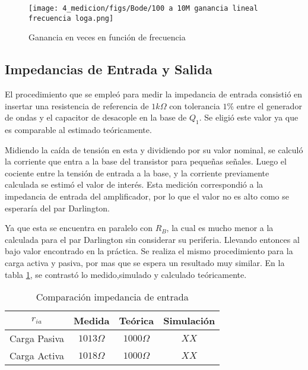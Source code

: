 \begin{figure}[ht]
    \centering
    \texttt{[image: 4\_medicion/figs/Bode/100 a 10M ganancia lineal frecuencia loga.png]}
    \caption{Ganancia en veces en función de frecuencia}\label{fig:ganancia veces funcion frecuencia medido}
\end{figure}



\subsection{Impedancias de Entrada y Salida}

El procedimiento que se empleó para medir la impedancia de entrada consistió en insertar una resistencia de referencia de $1 k\Omega$ con tolerancia $1\%$ entre el generador de ondas y el capacitor de desacople en la base de $Q_1$. Se eligió este valor ya que es comparable al estimado teóricamente.

Midiendo la caída de tensión en esta y dividiendo por su valor nominal, se calculó la corriente que entra a la base del transistor para pequeñas señales. Luego el cociente entre la tensión de entrada a la base, y la corriente previamente calculada se estimó el valor de interés. Esta medición correspondió a la impedancia de entrada del amplificador, por lo que el valor no es alto como se esperaría del par Darlington.

Ya que esta se encuentra en paralelo con $R_B$, la cual es mucho menor a la calculada para el par Darlington sin considerar su periferia. Llevando entonces al bajo valor encontrado en la práctica.
Se realiza el mismo procedimiento para la carga activa y pasiva, por mas que se espera un resultado muy similar. En la tabla \ref{table:Ri comp}, se contrastó lo medido,simulado y calculado teóricamente.

\begin{table}[ht]
    \centering
    \begin{tabular}{|c|c|c|c|}
    \hline
    $r_{ia}$     & Medida       & Teórica         & Simulación \\ \hline
    Carga Pasiva & $1013\Omega$ & $1000\Omega $   &  $XX $          \\ \hline
    Carga Activa & $1018\Omega$ & $1000\Omega $  &  $XX $          \\ \hline
    \end{tabular}
    \caption{Comparación impedancia de entrada}\label{table:Ri comp}
\end{table}

